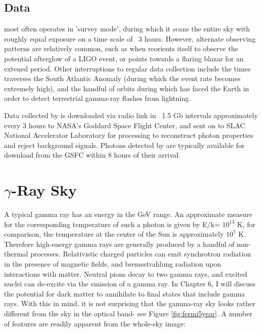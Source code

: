 \subsection{Data}
\Fermi most often operates in 'survey mode', during which it scans the entire sky with roughly equal exposure on a time scale of ~3 hours. However, alternate observing patterns are relatively common, such as when \Fermi reorients itself to observe the potential afterglow of a LIGO event, or points towards a flaring blazar for an extened period. Other interruptions to regular data collection include the times \Fermi traverses the South Atlantic Anomaly (during which the event rate becomes extremely high), and the handful of orbits during which \Fermi has faced the Earth in order to detect terrestrial gamma-ray flashes from lightning.

Data collected by \FermiLAT is downloaded via radio link in ~1.5 Gb intervals approximately every 3 hours to NASA's Goddard Space Flight Center, and sent on to SLAC National Accelerator Laboratory for processing to reconstruct photon properties and reject background signals. Photons detected by \FermiLAT are typically available for download from the GSFC within 8 hours of their arrival.

\section{$\gamma$-Ray Sky}
A typical \FermiLAT gamma ray has an energy in the GeV range. An approximate measure for the corresponding temperature of such a photon is given by E/k= $10^13$ K, for comparison, the temperature at the center of the Sun is approximately $10^7$ K. Therefore high-energy gamma rays are generally produced by a handful of non-thermal processes. Relativistic charged particles can emit synchrotron radiation in the presence of magnetic fields, and bremsstrahlung radiation upon interactions with matter. Neutral pions decay to two gamma rays, and excited nuclei can de-excite via the emission of a gamma ray. In Chapter 6, I will discuss the potential for dark matter to annihilate to final states that include gamma rays.
With this in mind, it is not surprising that the gamma-ray sky looks rather different from the sky in the optical band- see Figure \ref{fig:fermi5year}. A number of features are readily apparent from the whole-sky image:

